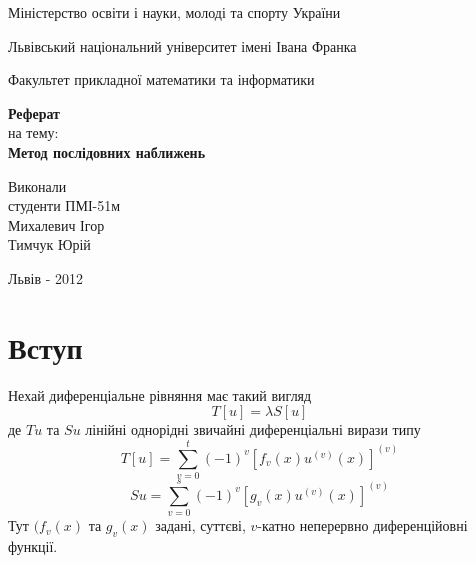 \documentclass[12pt,a4paper]{article}
\begin{document}

\setlength{\parindent}{1.5cm}
\fontsize{14pt}{6mm}\selectfont

\begin{center}
  Міністерство освіти і науки, молоді та спорту України
  
  Львівський національний університет імені Івана Франка

  Факультет прикладної математики та інформатики
\end{center}


\vspace{6cm}

\begin{center}
  {\bfseries\Large Реферат}\\[0.5cm]
  на тему:\\[0.5cm]
  {\bfseries\Large Метод послідовних наближень}\\
\end{center}

\vspace{2cm}

\begin{flushleft}
  Виконали\\
  студенти ПМІ-51м\\
  Михалевич Ігор\\
  Тимчук Юрій
\end{flushleft}

\vspace{6cm}

\begin{center}
  Львів - 2012 
\end{center}

\clearpage

\fontsize{14pt}{6mm}\selectfont

\section{Вступ}

Нехай диференціальне рівняння має такий вигляд
\begin{equation}\label{eq:dfEq}
	T[u] = \lambda S[u]
\end{equation}
де $Tu$ та $Su$ лінійні однорідні звичайні диференціальні вирази типу
\begin{equation}\label{eq:defTu}
	T[u] = \sum_{v=0}^t(-1)^v[f_v(x)u^{(v)}(x)]^{(v)}
\end{equation}
\begin{equation}\label{eq:defSu}
	Su = \sum_{v=0}^s(-1)^v[g_v(x)u^{(v)}(x)]^{(v)}
\end{equation}
Тут $(f_v(x)$ та $g_v(x)$ задані, суттєві, $v$-катно неперервно диференційовні функції. 
\end{document}
